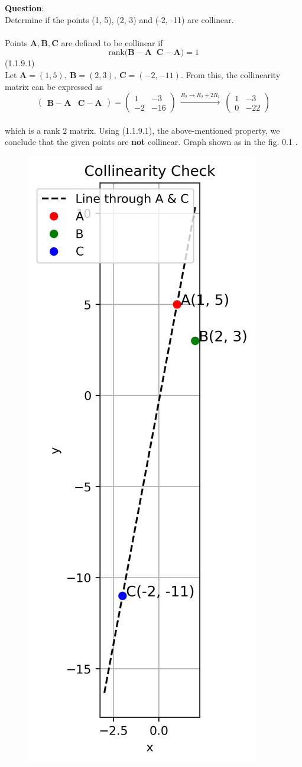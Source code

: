 \documentclass[journal]{IEEEtran}
\begin{document}
	\textbf{Question}:\\
	Determine if the points (1, 5), (2, 3) and (-2, -11) are collinear.\\ 
	\solution \\
	Points $\mathbf{A}, \mathbf{B}, \mathbf{C}$ are defined to be collinear if $$
	\text{rank}\Big( \mathbf{B}-\mathbf{A} \;\; \mathbf{C}-\mathbf{A} \Big) = 1  $$
	\hfill{(1.1.9.1)}\\
	Let $\mathbf{A}=(1,5),\ \mathbf{B}=(2,3),\ \mathbf{C}=(-2,-11)$.
	From this, the collinearity matrix can be expressed as\\
	\[ \left(
	\begin{matrix}
		\mathbf{B}-\mathbf{A} & \mathbf{C}-\mathbf{A}
	\end{matrix}\right)
	=
	\begin{pmatrix}
		1 & -3\\
		-2 & -16
	\end{pmatrix}
	\ \overset{R_2 \rightarrow R_2+2R_1}{\longrightarrow}\
	\begin{pmatrix}
		1 & -3\\
		0 & -22
	\end{pmatrix} \]
	\\
	which is a rank $2$ matrix. Using (1.1.9.1), the above-mentioned property,
	we conclude that the given points are \textbf{not} collinear. Graph shown as in the fig. 0.1 .
	\begin{figure}
		\centering
		\includegraphics[width=0.5\linewidth]{figs/collinearity}
		\caption{}
		\label{fig:collinearity}
	\end{figure}
	
	
	

	
\end{document}
